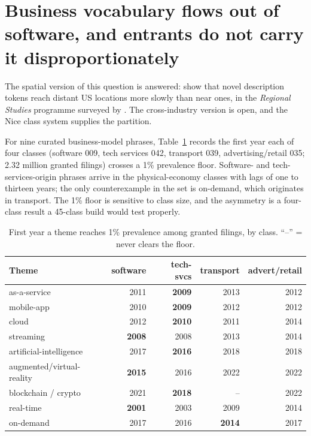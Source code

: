 \documentclass[11pt]{article}
\begin{document}
\section{Business vocabulary flows out of software, and entrants do not carry it disproportionately}\label{sec:diffusion}

The spatial version of this question is answered: \citet{vonGraevenitz2022}
show that novel description tokens reach distant US locations more slowly
than near ones, in the \emph{Regional Studies} programme surveyed by
\citet{CastaldiMendonca2022}. The cross-industry version is open, and the
Nice class system supplies the partition.

For nine curated business-model phrases, Table~\ref{tab:transit} records
the first year each of four classes (software 009, tech services 042,
transport 039, advertising/retail 035; 2.32 million granted filings)
crosses a 1\% prevalence floor. Software- and tech-services-origin
phrases arrive in the physical-economy classes with lags of one to
thirteen years; the only counterexample in the set is on-demand, which
originates in transport. The 1\% floor is sensitive to class size, and
the asymmetry is a four-class result a 45-class build would test
properly.

\begin{table}[h]\centering\small
\caption{First year a theme reaches 1\% prevalence among granted filings,
by class. ``--'' = never clears the floor.}
\label{tab:transit}
\begin{tabular}{lrrrr}
\toprule
Theme & software & tech-svcs & transport & advert/retail \\
\midrule
as-a-service              & 2011 & \textbf{2009} & 2013 & 2012 \\
mobile-app                & 2010 & \textbf{2009} & 2012 & 2012 \\
cloud                     & 2012 & \textbf{2010} & 2011 & 2014 \\
streaming                 & \textbf{2008} & 2008 & 2013 & 2014 \\
artificial-intelligence   & 2017 & \textbf{2016} & 2018 & 2018 \\
augmented/virtual-reality & \textbf{2015} & 2016 & 2022 & 2022 \\
blockchain / crypto       & 2021 & \textbf{2018} & --   & 2022 \\
real-time                 & \textbf{2001} & 2003 & 2009 & 2014 \\
on-demand                 & 2017 & 2016 & \textbf{2014} & 2017 \\
\bottomrule
\end{tabular}
\end{table}
\end{document}

